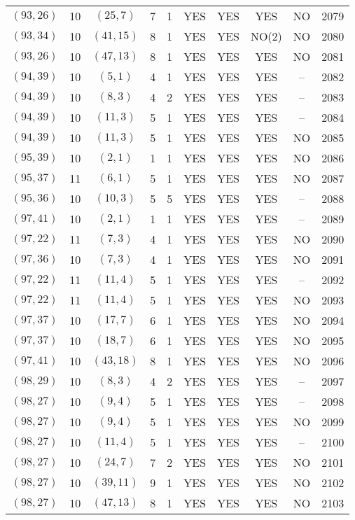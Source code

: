 \begin{longtable}{|c|c|c|c|c|c|c|c|c|c|}
$(93, 26)$ & 10 & $(25, 7)$ & 7 & 1 & YES & YES & YES & NO & 2079\\
$(93, 34)$ & 10 & $(41, 15)$ & 8 & 1 & YES & YES & NO(2) & NO & 2080\\
$(93, 26)$ & 10 & $(47, 13)$ & 8 & 1 & YES & YES & YES & NO & 2081\\
$(94, 39)$ & 10 & $(5, 1)$ & 4 & 1 & YES & YES & YES & -- & 2082\\
$(94, 39)$ & 10 & $(8, 3)$ & 4 & 2 & YES & YES & YES & -- & 2083\\
$(94, 39)$ & 10 & $(11, 3)$ & 5 & 1 & YES & YES & YES & -- & 2084\\
$(94, 39)$ & 10 & $(11, 3)$ & 5 & 1 & YES & YES & YES & NO & 2085\\
$(95, 39)$ & 10 & $(2, 1)$ & 1 & 1 & YES & YES & YES & NO & 2086\\
$(95, 37)$ & 11 & $(6, 1)$ & 5 & 1 & YES & YES & YES & NO & 2087\\
$(95, 36)$ & 10 & $(10, 3)$ & 5 & 5 & YES & YES & YES & -- & 2088\\
$(97, 41)$ & 10 & $(2, 1)$ & 1 & 1 & YES & YES & YES & -- & 2089\\
$(97, 22)$ & 11 & $(7, 3)$ & 4 & 1 & YES & YES & YES & NO & 2090\\
$(97, 36)$ & 10 & $(7, 3)$ & 4 & 1 & YES & YES & YES & NO & 2091\\
$(97, 22)$ & 11 & $(11, 4)$ & 5 & 1 & YES & YES & YES & -- & 2092\\
$(97, 22)$ & 11 & $(11, 4)$ & 5 & 1 & YES & YES & YES & NO & 2093\\
$(97, 37)$ & 10 & $(17, 7)$ & 6 & 1 & YES & YES & YES & NO & 2094\\
$(97, 37)$ & 10 & $(18, 7)$ & 6 & 1 & YES & YES & YES & NO & 2095\\
$(97, 41)$ & 10 & $(43, 18)$ & 8 & 1 & YES & YES & YES & NO & 2096\\
$(98, 29)$ & 10 & $(8, 3)$ & 4 & 2 & YES & YES & YES & -- & 2097\\
$(98, 27)$ & 10 & $(9, 4)$ & 5 & 1 & YES & YES & YES & -- & 2098\\
$(98, 27)$ & 10 & $(9, 4)$ & 5 & 1 & YES & YES & YES & NO & 2099\\
$(98, 27)$ & 10 & $(11, 4)$ & 5 & 1 & YES & YES & YES & -- & 2100\\
$(98, 27)$ & 10 & $(24, 7)$ & 7 & 2 & YES & YES & YES & NO & 2101\\
$(98, 27)$ & 10 & $(39, 11)$ & 9 & 1 & YES & YES & YES & NO & 2102\\
$(98, 27)$ & 10 & $(47, 13)$ & 8 & 1 & YES & YES & YES & NO & 2103\\

\end{longtable}
